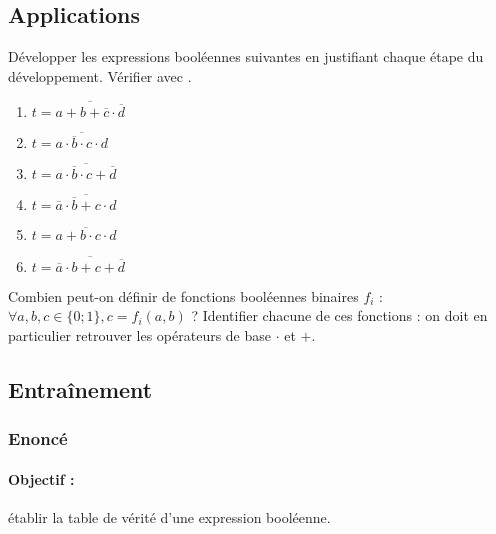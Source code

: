\subsection{Applications}

\begin{question}
Développer les expressions booléennes suivantes
en justifiant chaque étape du développement.
Vérifier avec \python.
\begin{enumerate}  
\item $t = \overline{a + b + \overline{c} \cdot \overline{d}}$
\item $t = \overline{a \cdot \overline{b} \cdot c \cdot d}$ 
\item $t = \overline{a \cdot \overline{b} \cdot {c} + \overline{d}}$
\item $t = \overline{\overline{a} \cdot \overline{b} + {c} \cdot {d}}$
\item $t = \overline{a + b \cdot c \cdot d}$
\item $t = \overline{\overline{a} \cdot b + {c} + \overline{d}}$
\end{enumerate}
\end{question}

\begin{question}
Combien peut-on définir de fonctions booléennes binaires $f_i$ :
$\forall a, b, c \in \{0;1\}, c = f_i(a,b)$ ? Identifier chacune de ces fonctions :
on doit en particulier retrouver les opérateurs de base $\cdot$ et $+$.
\end{question}
\subsection{Entraînement}

\subsubsection{Enoncé}


\paragraph{Objectif :} établir la table de vérité d'une expression booléenne.

